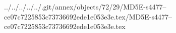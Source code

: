 ../../../../../.git/annex/objects/72/29/MD5E-s4477--ce07c7225853c73736692ede1e053e3e.tex/MD5E-s4477--ce07c7225853c73736692ede1e053e3e.tex
